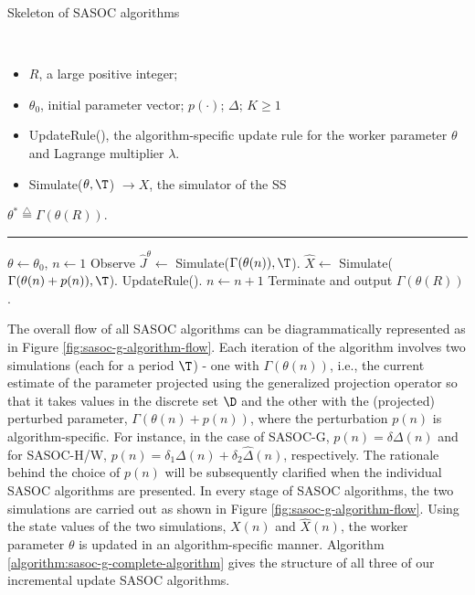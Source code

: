 \documentclass[11pt,letterpaper,english]{article}
\begin{document}
\begin{minipage}[c][\textheight]{\textwidth}
\begin{nonfloatalgorithm}{Skeleton of SASOC algorithms}
\label{algorithm:sasoc-g-complete-algorithm}
\begin{algorithmic}
\INPUT \ \\
\begin{itemize}[$\bullet$]
\item $R$, a large positive integer;
\item $\theta_0$, initial parameter vector; $p(\cdot)$; $\Delta$; $K \ge 1$
\item UpdateRule(), the algorithm-specific update rule for the worker parameter $\theta$ and Lagrange multiplier $\lambda$.
\item Simulate($\theta, \T$) $\rightarrow X$, the simulator of the SS
\end{itemize}
\OUTPUT $\theta^* \stackrel{\triangle}{=} \Gamma(\theta(R))$.
\hrule\vspace{1ex}
\STATE $\theta \leftarrow \theta_0$, $n \leftarrow 1$
\LOOP
\STATE Observe $\hat J^{\theta} \leftarrow$ Simulate($\Gamma(\theta(n)),\T$).
\STATE $\hat{X} \leftarrow$ Simulate($\Gamma(\theta(n) + p(n)),\T$).
\STATE UpdateRule().
\STATE $n \leftarrow n + 1$
\STATE Terminate and output $\Gamma(\theta(R))$.
\ENDIF
\ENDLOOP
\end{algorithmic}
\end{nonfloatalgorithm}
\end{minipage}


The overall flow of all SASOC algorithms can be diagrammatically represented as in Figure
\ref{fig:sasoc-g-algorithm-flow}. Each iteration of the algorithm involves two simulations (each for a period $\T$) - one with $\Gamma(\theta(n))$, i.e., the current estimate of the parameter projected using the generalized projection operator so that it takes values in the discrete set $\D$ and the other with the (projected) perturbed parameter, $\Gamma(\theta(n) + p(n))$, where the perturbation $p(n)$ is algorithm-specific. 
For instance, in the case of SASOC-G, $p(n) = \delta \Delta(n)$ and for SASOC-H/W, 
$p(n) = \delta_1 \Delta(n) + \delta_2 \hat\Delta(n)$, respectively. The rationale behind the choice of 
$p(n)$ will be subsequently clarified when the individual SASOC algorithms are presented.  In every stage of SASOC algorithms, the two simulations are carried out as shown in Figure \ref{fig:sasoc-g-algorithm-flow}. Using the state values of the two simulations, $X(n)$ and $\hat X(n)$, the worker parameter $\theta$ is updated in an algorithm-specific 
manner. Algorithm \ref{algorithm:sasoc-g-complete-algorithm} gives the structure of all three of our incremental update SASOC algorithms.
\end{document}
